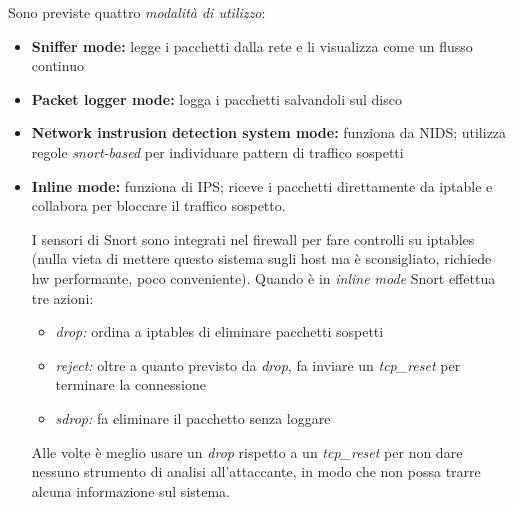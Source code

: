 \noindent Sono previste quattro \textit{modalità di utilizzo}:
\begin{itemize}
    \item \textbf{Sniffer mode:} legge i pacchetti dalla rete e li visualizza come un flusso continuo 
    \item \textbf{Packet logger mode:} logga i pacchetti salvandoli sul disco 
    \item \textbf{Network instrusion detection system mode:} funziona da NIDS; utilizza regole 
    \textit{snort-based} per individuare pattern di traffico sospetti 
    \item \textbf{Inline mode:} funziona di IPS; riceve i pacchetti direttamente da iptable e collabora per 
    bloccare il traffico sospetto.

    \noindent I sensori di Snort sono integrati nel firewall per fare controlli su iptables (nulla vieta di mettere questo 
    sistema sugli host ma è sconsigliato, richiede hw performante, poco conveniente).
    \noindent Quando è in \textit{inline mode} Snort effettua tre azioni:
    \begin{itemize}
        \item \textit{drop:} ordina a iptables di eliminare pacchetti sospetti 
        \item \textit{reject:} oltre a quanto previsto da \textit{drop}, fa inviare un \textit{tcp\_reset} per terminare la connessione 
        \item \textit{sdrop:} fa eliminare il pacchetto senza loggare
    \end{itemize}

    \noindent Alle volte è meglio usare un \textit{drop} rispetto a un \textit{tcp\_reset} per non dare nessuno strumento di analisi 
    all'attaccante, in modo che non possa trarre alcuna informazione sul sistema.
\end{itemize}











